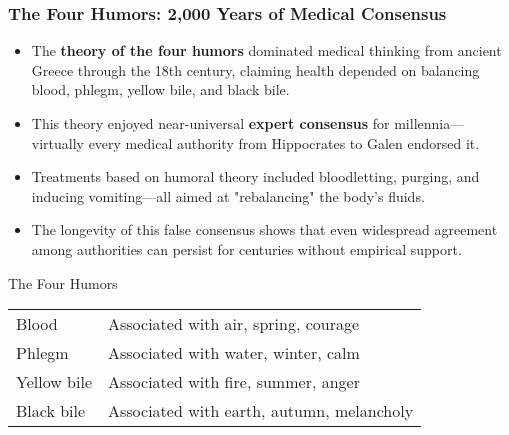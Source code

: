 \documentclass{beamer}
\begin{document}
	\begin{frame}
		\frametitle{The Four Humors: 2,000 Years of Medical Consensus}
		\begin{itemize}
			\item The \textbf{theory of the four humors} dominated medical thinking from ancient Greece through the 18th century, claiming health depended on balancing blood, phlegm, yellow bile, and black bile.
			\item This theory enjoyed near-universal \textbf{expert consensus} for millennia—virtually every medical authority from Hippocrates to Galen endorsed it.
			\item Treatments based on humoral theory included bloodletting, purging, and inducing vomiting—all aimed at "rebalancing" the body's fluids.
			\item The longevity of this false consensus shows that even widespread agreement among authorities can persist for centuries without empirical support.
		\end{itemize}
		
		\begin{block}{The Four Humors}
			\begin{tabular}{ll}
				Blood & Associated with air, spring, courage \\
				Phlegm & Associated with water, winter, calm \\
				Yellow bile & Associated with fire, summer, anger \\
				Black bile & Associated with earth, autumn, melancholy
			\end{tabular}
		\end{block}
	\end{frame}
	
\end{document}
